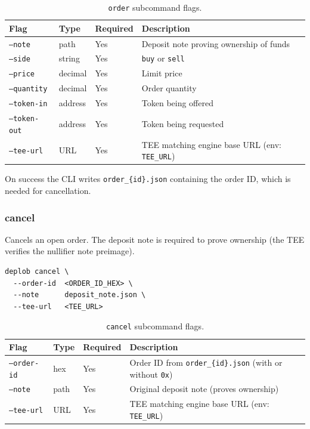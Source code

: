 \documentclass[12pt,a4paper]{article}
\begin{document}
\begin{table}[H]
\centering
\small
\begin{tabular}{|l|l|l|p{4.5cm}|}
\hline
\textbf{Flag} & \textbf{Type} & \textbf{Required} & \textbf{Description} \\
\hline
\texttt{--note} & path & Yes & Deposit note proving ownership of funds \\
\hline
\texttt{--side} & string & Yes & \texttt{buy} or \texttt{sell} \\
\hline
\texttt{--price} & decimal & Yes & Limit price \\
\hline
\texttt{--quantity} & decimal & Yes & Order quantity \\
\hline
\texttt{--token-in} & address & Yes & Token being offered \\
\hline
\texttt{--token-out} & address & Yes & Token being requested \\
\hline
\texttt{--tee-url} & URL & Yes & TEE matching engine base URL (env: \texttt{TEE\_URL}) \\
\hline
\end{tabular}
\caption{\texttt{order} subcommand flags.}
\end{table}

\noindent On success the CLI writes \texttt{order\_\{id\}.json} containing the order ID, which is needed for cancellation.

\subsubsection{cancel}

Cancels an open order.  The deposit note is required to prove ownership (the TEE verifies the nullifier note preimage).

\begin{verbatim}
deplob cancel \
  --order-id  <ORDER_ID_HEX> \
  --note      deposit_note.json \
  --tee-url   <TEE_URL>
\end{verbatim}

\begin{table}[H]
\centering
\small
\begin{tabular}{|l|l|l|p{5cm}|}
\hline
\textbf{Flag} & \textbf{Type} & \textbf{Required} & \textbf{Description} \\
\hline
\texttt{--order-id} & hex & Yes & Order ID from \texttt{order\_\{id\}.json} (with or without \texttt{0x}) \\
\hline
\texttt{--note} & path & Yes & Original deposit note (proves ownership) \\
\hline
\texttt{--tee-url} & URL & Yes & TEE matching engine base URL (env: \texttt{TEE\_URL}) \\
\hline
\end{tabular}
\caption{\texttt{cancel} subcommand flags.}
\end{table}
\end{document}
